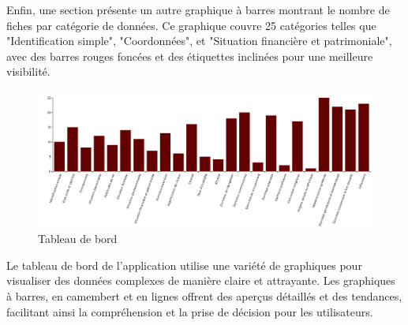 \noindent Enfin, une section présente un autre graphique à barres montrant le nombre de fiches par catégorie de données. Ce graphique couvre 25 catégories telles que "Identification simple", "Coordonnées", et "Situation financière et patrimoniale", avec des barres rouges foncées et des étiquettes inclinées pour une meilleure visibilité.


\begin{figure}[H]
    \centering
    \includegraphics[width=\textwidth]{images/guis/dashboard4.png}
    \caption{Tableau de bord}
\end{figure}

\noindent Le tableau de bord de l'application utilise une variété de graphiques pour visualiser des données complexes de manière claire et attrayante. Les graphiques à barres, en camembert et en lignes offrent des aperçus détaillés et des tendances, facilitant ainsi la compréhension et la prise de décision pour les utilisateurs.
